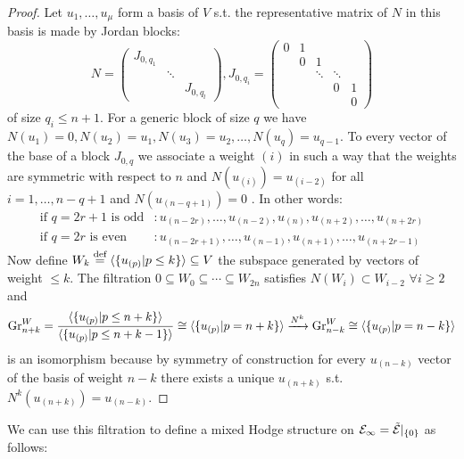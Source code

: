 \documentclass[../main.tex]{subfiles}
\begin{document}
\begin{proof}
    Let $u_1, \dots, u_\mu$ form a basis of $V$ s.t. the representative matrix of $N$ in this basis is made by Jordan blocks:
    \[    
N=\begin{pmatrix}
J_{0,q_1} &    &  \\ 
  & \ddots  & \\
& & J_{0,q_l}
\end{pmatrix},
J_{0,q_i}=\begin{pmatrix}
0 & 1 &        &        & \\ 
  & 0 & 1      &        & \\
  &   & \ddots & \ddots & \\
  &   &  & 0 & 1 \\
    &   &  &  & 0
\end{pmatrix}
\]
of size $q_i \leq n+1$. For a generic block of size $q$ we have $N(u_1)=0, N(u_2)=u_1, N(u_3)=u_2, \dots ,N(u_q)=u_{q-1} $.
To every vector of the base of a block $J_{0,q}$ we associate a weight $(i)$ in such a way that the weights are symmetric with respect to $n$ and $N(u_{(i)})=u_{(i-2)}$ for all $i =1, \dots, n-q+1$ and $N(u_{(n-q+1)})=0$ . In other words:
\begin{align*}
    \text{if $q=2r+1$ is odd} &: u_{(n-2r)}, \dots, u_{(n-2)},  u_{(n)},  u_{(n+2)}, \dots,  u_{(n+2r)} \\
    \text{if $q=2r$ is even} &: u_{(n-2r+1)}, \dots, u_{(n-1)}, u_{(n+1)}, \dots,  u_{(n+2r-1)} 
\end{align*}
Now define $W_k \stackrel{\text{def}}{=} \langle \{ u_{(p)} | p \leq k \} \rangle \subseteq V$ the subspace generated by vectors of weight $\leq k$. The filtration  $0 \subseteq W_0 \subseteq \cdots \subseteq W_{2n}$ satisfies $N(W_i) \subset W_{i-2}$ $ \forall i \geq 2$ and
\[
\operatorname{Gr}_{n+k}^W = \frac{\langle \{ u_{(p)} | p \leq n+k \}\rangle}{\langle \{ u_{(p)} | p \leq n+k-1 \}\rangle} \cong \langle \{ u_{(p)} | p = n+k \}\rangle \xrightarrow{N^k}  \operatorname{Gr}_{n-k}^W \cong  \langle \{ u_{(p)} | p = n-k \}\rangle
\]
is an isomorphism because by symmetry of construction for every $u_{(n-k)}$ vector of the basis of weight $n-k$ there exists a unique $u_{(n+k)}$ s.t. $N^k(u_{(n+k)}) =u_{(n-k)} $.
\end{proof}

We can use this filtration to define a mixed Hodge structure on $\mathcal{E}_{\infty}=\tilde{\mathcal{E}}|_{\{0\}}$ as follows:
\end{document}
